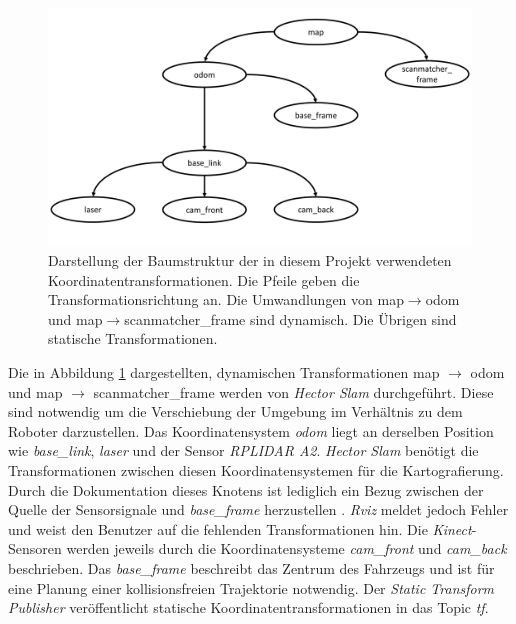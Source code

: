 		   		\begin{figure}[H]
		   			\centering
		   			\includegraphics[width=1.0\textwidth]{Bilder/frames}
		   			\caption{Darstellung der Baumstruktur der in diesem Projekt verwendeten Koordinatentransformationen. Die Pfeile geben die Transformationsrichtung an. Die Umwandlungen von map$\rightarrow$odom und map$\rightarrow$scanmatcher\_frame sind dynamisch. Die Übrigen sind statische Transformationen.  }
		   			\label{fig: Baum der Koordinatentransformationen}
		   		\end{figure}
		      		    
		        Die in Abbildung \ref{fig: Baum der Koordinatentransformationen} dargestellten, dynamischen Transformationen map $\rightarrow$ odom und map $\rightarrow$ scanmatcher\_frame werden von \textit{Hector Slam} durchgeführt. Diese sind notwendig um die Verschiebung der Umgebung im Verhältnis zu dem Roboter darzustellen. Das Koordinatensystem \textit{odom} liegt an derselben Position wie \textit{base\_link}, \textit{laser} und der Sensor \textit{RPLIDAR A2}. \textit{Hector Slam} benötigt die Transformationen zwischen diesen Koordinatensystemen für die Kartografierung. Durch die Dokumentation dieses Knotens ist lediglich ein Bezug zwischen der Quelle der Sensorsignale und \textit{base\_frame} herzustellen \cite{hectorslam}. \textit{Rviz} meldet jedoch Fehler und weist den Benutzer auf die fehlenden Transformationen hin. Die \textit{Kinect}-Sensoren werden jeweils durch die Koordinatensysteme \textit{cam\_front} und \textit{cam\_back} beschrieben. Das \textit{base\_frame} beschreibt das Zentrum des Fahrzeugs und ist für eine Planung einer kollisionsfreien Trajektorie notwendig. Der \textit{Static Transform Publisher} veröffentlicht statische Koordinatentransformationen in das Topic \textit{tf}. \cite{sttrpu}
		 			    
